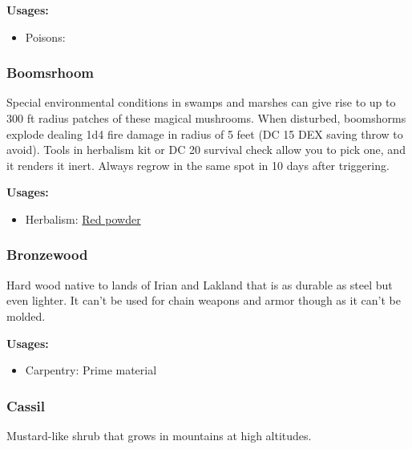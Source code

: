 \vspace{5mm}

\textbf{Usages:}

\begin{itemize}[noitemsep]
\item[] Poisons: \poison
\end{itemize}

\subsubsection{Boomsrhoom}
\label{Boomsrhoom}

Special environmental conditions in swamps and marshes can give rise to up to 300 ft radius patches of these magical mushrooms. When disturbed, boomshorms explode dealing 1d4 fire damage in radius of 5 feet (DC 15 DEX saving throw to avoid). Tools in herbalism kit or DC 20 survival check allow you to pick one, and it renders it inert. Always regrow in the same spot in 10 days after triggering.

\vspace{5mm}

\textbf{Usages:}

\begin{itemize}[noitemsep]
\item[] Herbalism: \hyperref[Red powder]{Red powder}
\end{itemize}

\subsubsection{Bronzewood}
\label{Bronzewood}

Hard wood native to lands of Irian and Lakland that is as durable as steel but even lighter. It can't be used for chain weapons and armor though as it can't be molded.

\vspace{5mm}

\textbf{Usages:}

\begin{itemize}[noitemsep]
\item[] Carpentry: Prime material
\end{itemize}

\subsubsection{Cassil}
\label{Cassil}

Mustard-like shrub that grows in mountains at high altitudes.

